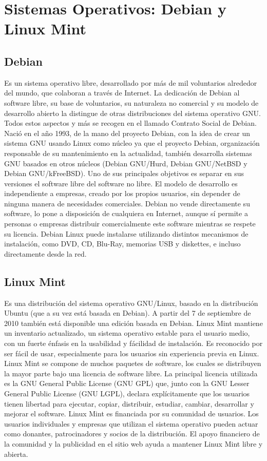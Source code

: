 \documentclass[12pt,a4paper]{report}
\begin{document}
\section{Sistemas Operativos: Debian y Linux Mint}

\subsection{Debian}

Es un sistema operativo libre, desarrollado por más de mil voluntarios alrededor
del mundo, que colaboran a través de Internet.  La dedicación de Debian al
software libre, su base de voluntarios, su naturaleza no comercial y su modelo
de desarrollo abierto la distingue de otras distribuciones del sistema operativo
GNU. Todos estos aspectos y más se recogen en el llamado Contrato Social de
Debian.  Nació en el año 1993, de la mano del proyecto Debian, con la idea de
crear un sistema GNU usando Linux como núcleo ya que el proyecto Debian,
organización responsable de su mantenimiento en la actualidad, también
desarrolla sistemas GNU basados en otros núcleos (Debian GNU/Hurd, Debian
GNU/NetBSD y Debian GNU/kFreeBSD).  Uno de sus principales objetivos es separar
en sus versiones el software libre del software no libre. El modelo de
desarrollo es independiente a empresas, creado por los propios usuarios, sin
depender de ninguna manera de necesidades comerciales. Debian no vende
directamente su software, lo pone a disposición de cualquiera en Internet,
aunque sí permite a personas o empresas distribuir comercialmente este software
mientras se respete su licencia.  Debian Linux puede instalarse utilizando
distintos mecanismos de instalación, como DVD, CD, Blu-Ray, memorias USB y
diskettes, e incluso directamente desde la red.

\subsection{Linux Mint}

Es una distribución del sistema operativo GNU/Linux, basado en la distribución
Ubuntu (que a su vez está basada en Debian). A partir del 7 de septiembre de
2010 también está disponible una edición basada en Debian.  Linux Mint mantiene
un inventario actualizado, un sistema operativo estable para el usuario medio,
con un fuerte énfasis en la usabilidad y fácilidad de instalación. Es reconocido
por ser fácil de usar, especialmente para los usuarios sin experiencia previa en
Linux.  Linux Mint se compone de muchos paquetes de software, los cuales se
distribuyen la mayor parte bajo una licencia de software libre. La principal
licencia utilizada es la GNU General Public License (GNU GPL) que, junto con la
GNU Lesser General Public License (GNU LGPL), declara explícitamente que los
usuarios tienen libertad para ejecutar, copiar, distribuir, estudiar, cambiar,
desarrollar y mejorar el software. Linux Mint es financiada por su comunidad de
usuarios. Los usuarios individuales y empresas que utilizan el sistema operativo
pueden actuar como donantes, patrocinadores y socios de la distribución. El
apoyo financiero de la comunidad y la publicidad en el sitio web ayuda a
mantener Linux Mint libre y abierta.
\end{document}
